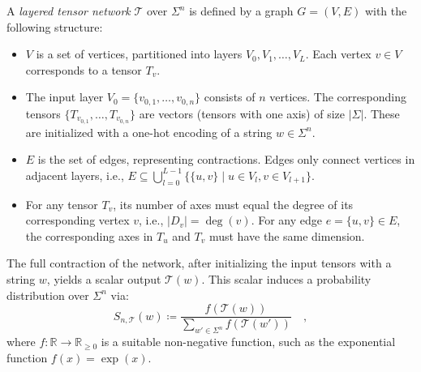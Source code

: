 \documentclass[../../main.tex]{subfiles}
\begin{document}
\begin{definition}
A \emph{layered tensor network} \( \mathcal{T} \) over \( \Sigma^n \) is defined by a graph \( G = (V, E) \) with the following structure:
\begin{itemize}
    \item \( V \) is a set of vertices, partitioned into layers \( V_0, V_1, \dots, V_L \). Each vertex \( v \in V \) corresponds to a tensor \( T_v \).

    \item The input layer \( V_0 = \{v_{0,1}, \dots, v_{0,n}\} \) consists of \( n \) vertices. The corresponding tensors \( \{T_{v_{0,1}}, \dots, T_{v_{0,n}}\} \) are vectors (tensors with one axis) of size \( |\Sigma| \). These are initialized with a one-hot encoding of a string \( w \in \Sigma^n \).

    \item \( E \) is the set of edges, representing contractions. Edges only connect vertices in adjacent layers, i.e., \( E \subseteq \bigcup_{l=0}^{L-1} \{\{u, v\} \mid u \in V_l, v \in V_{l+1}\} \).

    \item For any tensor \( T_v \), its number of axes must equal the degree of its corresponding vertex \( v \), i.e., \( |D_v| = \deg(v) \). For any edge \( e = \{u, v\} \in E \), the corresponding axes in \( T_u \) and \( T_v \) must have the same dimension.
\end{itemize}

The full contraction of the network, after initializing the input tensors with a string \( w \), yields a scalar output \( \mathcal{T}(w) \). This scalar induces a probability distribution over \( \Sigma^n \) via:
\[
S_{n, \mathcal{T}}(w) \coloneqq \frac{f(\mathcal{T}(w))}{\sum_{w' \in \Sigma^n} f(\mathcal{T}(w'))} \quad ,
\]
where \( f: \mathbb{R} \to \mathbb{R}_{\ge 0} \) is a suitable non-negative function, such as the exponential function \( f(x) = \exp(x) \).
\end{definition}
\end{document}
